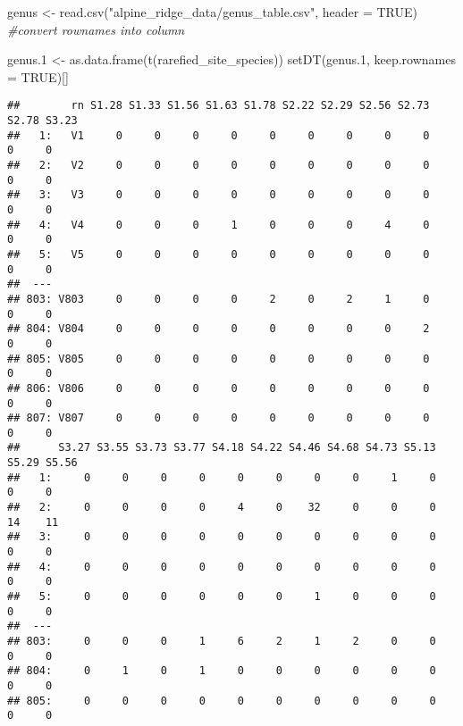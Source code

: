 \documentclass[
]{article}
\newenvironment{Shaded}{\begin{snugshade}}{\end{snugshade}}
\newcommand{\AttributeTok}[1]{\textcolor[rgb]{0.77,0.63,0.00}{#1}}
\newcommand{\CommentTok}[1]{\textcolor[rgb]{0.56,0.35,0.01}{\textit{#1}}}
\newcommand{\ConstantTok}[1]{\textcolor[rgb]{0.00,0.00,0.00}{#1}}
\newcommand{\FloatTok}[1]{\textcolor[rgb]{0.00,0.00,0.81}{#1}}
\newcommand{\FunctionTok}[1]{\textcolor[rgb]{0.00,0.00,0.00}{#1}}
\newcommand{\NormalTok}[1]{#1}
\newcommand{\OtherTok}[1]{\textcolor[rgb]{0.56,0.35,0.01}{#1}}
\newcommand{\StringTok}[1]{\textcolor[rgb]{0.31,0.60,0.02}{#1}}
\begin{document}
\begin{Shaded}
\begin{Highlighting}[]
\NormalTok{genus }\OtherTok{\textless{}{-}} \FunctionTok{read.csv}\NormalTok{(}\StringTok{"alpine\_ridge\_data/genus\_table.csv"}\NormalTok{, }\AttributeTok{header =} \ConstantTok{TRUE}\NormalTok{)}
\CommentTok{\#convert rownames into column}

\NormalTok{genus}\FloatTok{.1} \OtherTok{\textless{}{-}} \FunctionTok{as.data.frame}\NormalTok{(}\FunctionTok{t}\NormalTok{(rarefied\_site\_species))}
\FunctionTok{setDT}\NormalTok{(genus}\FloatTok{.1}\NormalTok{, }\AttributeTok{keep.rownames =} \ConstantTok{TRUE}\NormalTok{)[]}
\end{Highlighting}
\end{Shaded}

\begin{verbatim}
##        rn S1.28 S1.33 S1.56 S1.63 S1.78 S2.22 S2.29 S2.56 S2.73 S2.78 S3.23
##   1:   V1     0     0     0     0     0     0     0     0     0     0     0
##   2:   V2     0     0     0     0     0     0     0     0     0     0     0
##   3:   V3     0     0     0     0     0     0     0     0     0     0     0
##   4:   V4     0     0     0     1     0     0     0     4     0     0     0
##   5:   V5     0     0     0     0     0     0     0     0     0     0     0
##  ---                                                                       
## 803: V803     0     0     0     0     2     0     2     1     0     0     0
## 804: V804     0     0     0     0     0     0     0     0     2     0     0
## 805: V805     0     0     0     0     0     0     0     0     0     0     0
## 806: V806     0     0     0     0     0     0     0     0     0     0     0
## 807: V807     0     0     0     0     0     0     0     0     0     0     0
##      S3.27 S3.55 S3.73 S3.77 S4.18 S4.22 S4.46 S4.68 S4.73 S5.13 S5.29 S5.56
##   1:     0     0     0     0     0     0     0     0     1     0     0     0
##   2:     0     0     0     0     4     0    32     0     0     0    14    11
##   3:     0     0     0     0     0     0     0     0     0     0     0     0
##   4:     0     0     0     0     0     0     0     0     0     0     0     0
##   5:     0     0     0     0     0     0     1     0     0     0     0     0
##  ---                                                                        
## 803:     0     0     0     1     6     2     1     2     0     0     0     0
## 804:     0     1     0     1     0     0     0     0     0     0     0     0
## 805:     0     0     0     0     0     0     0     0     0     0     0     0

\end{verbatim}
\end{document}

